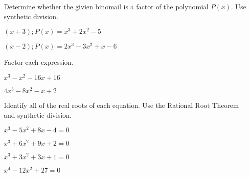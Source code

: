 \documentclass{report}
\theoremstyle{definition}
\begin{document}
\begin{enumerate}
\hspace{-2cm} Determine whether the givien binomail is a factor of the polynomial $P(x)$. Use synthetic division.\\

	\begin{minipage}[t]{0.45\linewidth}
		\item $(x+3); P(x)=x^3+2x^2-5$
	\end{minipage}
	\hfill
	\begin{minipage}[t]{0.45\linewidth}
		\item $(x-2); P(x)=2x^3-3x^2+x-6$
	\end{minipage}
	\vspace{3cm}
	
\hspace{-2cm}  Factor each expression.\\

	\begin{minipage}[t]{0.45\linewidth}
		\item  $x^3-x^2-16x+16$
	\end{minipage}
	\hfill
	\begin{minipage}[t]{0.45\linewidth}
		\item $4x^3-8x^2-x+2$
	\end{minipage}
	\vspace{3cm}
	
\hspace{-2cm}  Identify all of the real roots of each equation. Use the Rational Root Theorem and synthetic division.\\

	\begin{minipage}[t]{0.45\linewidth}
		\item $x^3-5x^2+8x-4=0$
	\end{minipage}
	\hfill
	\begin{minipage}[t]{0.45\linewidth}
		\item $x^3+6x^2+9x+2=0$
	\end{minipage}
	
	\vspace{4cm}
	
	\begin{minipage}[t]{0.45\linewidth}
		\item $x^3+3x^2+3x+1=0$
	\end{minipage}
	\hfill
	\begin{minipage}[t]{0.45\linewidth}
		\item $x^4-12x^2+27=0$
	\end{minipage}
	

\end{enumerate}
\end{document}
